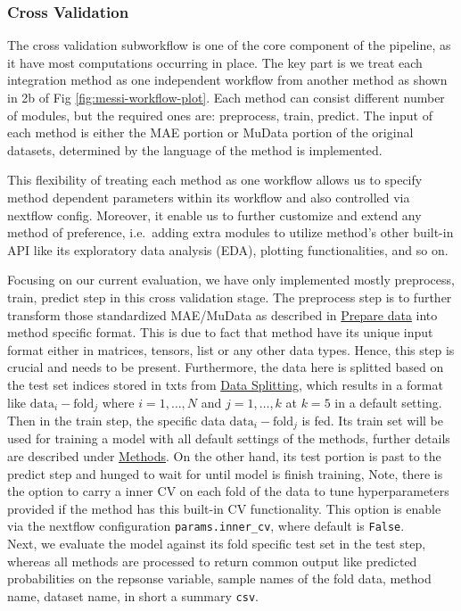 \documentclass[
]{article}
\begin{document}
\hypertarget{cross-validation}{%
\subsubsection{Cross Validation}\label{cross-validation}}

The cross validation subworkflow is one of the core component of the pipeline, as it have most computations occurring in place. The key part is we treat each integration method as one independent workflow from another method as shown in 2b of Fig \ref{fig:messi-workflow-plot}.
Each method can consist different number of modules, but the required ones are: preprocess, train, predict. The input of each method is either the MAE portion or MuData portion of the original datasets, determined by the language of the method is implemented.

This flexibility of treating each method as one workflow allows us to specify method dependent parameters within its workflow and also controlled via nextflow config. Moreover, it enable us to further customize and extend any method of preference, i.e.~adding extra modules to utilize method's other built-in API like its exploratory data analysis (EDA), plotting functionalities, and so on.

Focusing on our current evaluation, we have only implemented mostly preprocess, train, predict step in this cross validation stage. The preprocess step is to further transform those standardized MAE/MuData as described in \protect\hyperlink{prepare-data}{Prepare data} into method specific format. This is due to fact that method have its unique input format either in matrices, tensors, list or any other data types. Hence, this step is crucial and needs to be present. Furthermore, the data here is splitted based on the test set indices stored in txts from \protect\hyperlink{data-splitting}{Data Splitting}, which results in a format like \(\text{data}_i-\text{fold}_j\) where \(i = 1, \dots, N\) and \(j = 1, \dots, k\) at \(k=5\) in a default setting.
Then in the train step, the specific data \(\text{data}_i-\text{fold}_j\) is fed. Its train set will be used for training a model with all default settings of the methods, further details are described under \protect\hyperlink{methods}{Methods}. On the other hand, its test portion is past to the predict step and hunged to wait for until model is finish training, Note, there is the option to carry a inner CV on each fold of the data to tune hyperparameters provided if the method has this built-in CV functionality. This option is enable via the nextflow configuration \texttt{params.inner\_cv}, where default is \texttt{False}.\\
Next, we evaluate the model against its fold specific test set in the test step, whereas all methods are processed to return common output like predicted probabilities on the repsonse variable, sample names of the fold data, method name, dataset name, in short a summary \texttt{csv}.
\end{document}
